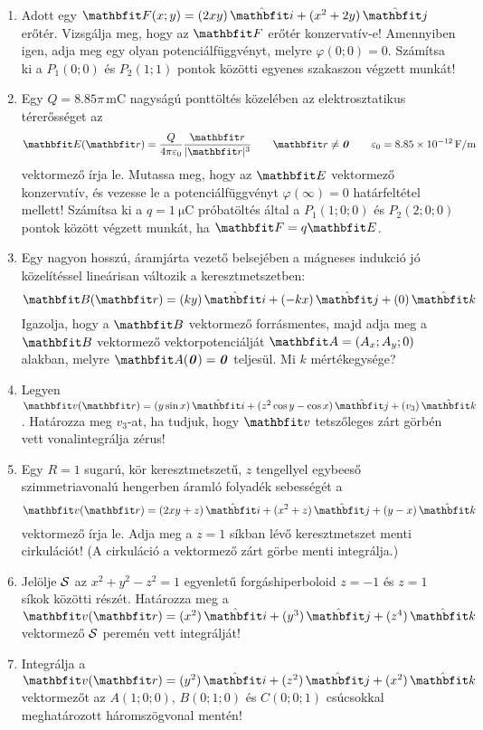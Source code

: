 \documentclass{szb-practice}
\begin{document}
\begin{enumerate}
  \item Adott egy $\rvec F(x; y) = \ijz{2xy}{x^2 + 2y}$ erőtér. Vizsgálja meg,
        hogy az $\rvec F$ erőtér konzervatív-e! Amennyiben igen, adja meg egy
        olyan potenciálfüggvényt, melyre $\varphi(0;0) = 0$. Számítsa ki a
        $P_1(0; 0)$ és $P_2(1; 1)$ pontok közötti egyenes szakaszon végzett
        munkát!

  \item Egy $Q = \num{8.85}\pi\,\si{\milli\coulomb}$ nagyságú ponttöltés
        közelében az elektrosztatikus térerősséget az
        $$
          \rvec E(\coordvec) = \frac{Q}{4\pi \varepsilon_0}
          \frac{\coordvec}{|\coordvec|^3}
          \qquad
          \coordvec \neq \nvec
          \qquad \varepsilon_0 = \SI[per-mode=symbol]{8,85e-12}{\farad\per\meter}
        $$
        vektormező írja le. Mutassa meg, hogy az $\rvec E$ vektormező
        konzervatív, és vezesse le a potenciálfüggvényt $\varphi(\infty) = 0$
        határfeltétel mellett! Számítsa ki a $q = \SI{1}{\micro\coulomb}$
        próbatöltés által a $P_1(1; 0; 0)$ és $P_2(2; 0; 0)$ pontok között
        végzett munkát, ha $\rvec F = q \rvec E$.

  \item Egy nagyon hosszú, áramjárta vezető belsejében a mágneses indukció
        jó közelítéssel lineárisan változik a keresztmetszetben:
        $$
          \rvec B(\coordv) = \ijk{ky}{-kx}{0}
        $$
        Igazolja, hogy a $\rvec B$ vektormező forrásmentes, majd adja meg
        a $\rvec B$ vektormező vektorpotenciálját $\rvec A = (A_x; A_y; 0)$
        alakban, melyre $\rvec A(\nvec) = \nvec$ teljesül. Mi $k$ mértékegysége?

  \item Legyen $\rvec v(\coordvec) = \ijk{y \sin x}{z^2 \cos y - \cos x}{v_3}$.
        Határozza meg $v_3$-at, ha tudjuk, hogy $\rvec v$ tetszőleges zárt
        görbén vett vonalintegrálja zérus!

  \item Egy $R = 1$ sugarú, kör keresztmetszetű, $z$ tengellyel egybeeső
        szimmetriavonalú hengerben áramló folyadék sebességét a
        $$
          \rvec v(\coordv) = \ijk{2xy + z}{x^2 + z}{y - x}
        $$
        vektormező írja le. Adja meg a $z = 1$ síkban lévő keresztmetszet
        menti cirkulációt!
        (A cirkuláció a vektormező zárt görbe menti integrálja.)

  \item Jelölje $\mathcal{S}$ az $x^2 + y^2 - z^2 = 1$ egyenletű
        forgáshiperboloid $z = -1$ és $z = 1$ síkok közötti részét.
        Határozza meg a $\rvec v(\coordvec) = \ijk{x^2}{y^3}{z^4}$
        vektormező $\mathcal{S}$ peremén vett integrálját!

  \item Integrálja a $\rvec v(\coordvec) = \ijk{y^2}{z^2}{x^2}$
        vektormezőt az $A(1;0;0)$, $B(0;1;0)$ és $C(0;0;1)$ csúcsokkal
        meghatározott háromszögvonal mentén!
\end{enumerate}
\end{document}
